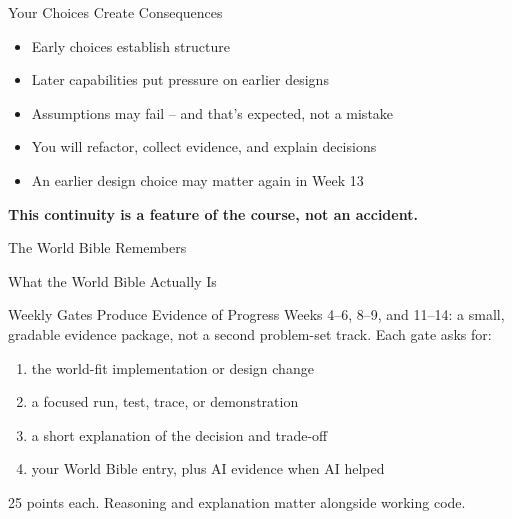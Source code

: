 \documentclass[aspectratio=169]{beamer}
\begin{document}
\begin{designdecisionframe}{Your Choices Create Consequences}
  \begin{itemize}
    \item Early choices establish structure
    \item Later capabilities put pressure on earlier designs
    \item Assumptions may fail -- and that's expected, not a mistake
    \item You will refactor, collect evidence, and explain decisions
    \item An earlier design choice may matter again in Week 13
  \end{itemize}
  \vspace{2mm}
  \textbf{This continuity is a feature of the course, not an accident.}
\end{designdecisionframe}

\begin{worldbibleframe}{The World Bible Remembers}
  \begin{worldbibleentry}{What the World Bible Actually Is}
  \end{worldbibleentry}
\end{worldbibleframe}

\begin{evidenceframe}{Weekly Gates Produce Evidence of Progress}
  Weeks 4--6, 8--9, and 11--14: a small, gradable evidence package, not a
  second problem-set track. Each gate asks for:
  \begin{enumerate}
    \item the world-fit implementation or design change
    \item a focused run, test, trace, or demonstration
    \item a short explanation of the decision and trade-off
    \item your World Bible entry, plus AI evidence when AI helped
  \end{enumerate}
  \vspace{2mm}
  \small 25 points each. Reasoning and explanation matter alongside working code.
\end{evidenceframe}
\end{document}
